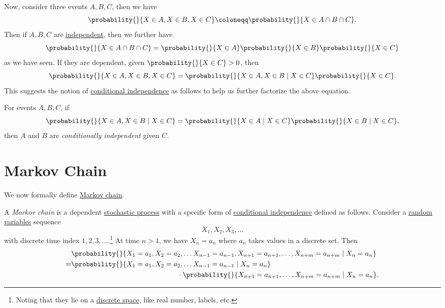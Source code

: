 Now, consider three events \(A, B, C\), then we have
\[
	\probability{}{X\in A, X\in B, X\in C} \coloneqq \probability{}{X\in A\cap B\cap C}.
\]
Then if \(A, B,  C\) are \hyperref[def:independent]{independent}, then we further have
\[
	\probability{}{X\in A\cap B\cap C}= \probability{}{X\in A}\probability{}{X\in B}\probability{}{X\in C}
\]
as we have seen. If they are dependent, given \(\probability{}{X\in C}>0\), then
\[
	\probability{}{X\in A, X\in B, X\in C} = \probability{}{X\in A, X\in B \mid X\in C}\probability{}{X\in C}.
\]
This suggests the notion of \hyperref[def:conditionally-independent]{conditional independence} as follows to help us further factorize the above equation.
\begin{definition}\label{def:conditionally-independent}
	For events \(A, B, C\), if
	\[
		\probability{}{X\in A, X\in B \mid X\in C} = \probability{}{X\in A \mid X\in C}\probability{}{X\in B \mid X\in C},
	\]
	then \(A\) and \(B\) are \emph{conditionally independent} given \(C\).
\end{definition}

\section{Markov Chain}
We now formally define \hyperref[def:Markov-chain]{Markov chain}.
\begin{definition}\label{def:Markov-chain}
	A \emph{Markov chain} is a dependent \hyperref[def:stochastic-process]{stochastic process} with a specific form of \hyperref[def:conditionally-independent]{conditional independence}
	defined as follows. Consider a \hyperref[def:random-variable]{random variables} sequence
	\[
		X_1, X_2, X_3, \ldots
	\]
	with discrete time index \(1, 2, 3, \ldots \).\footnote{Noting that they lie on a \underline{discrete space}, like real number, labels, etc.}
	At time \(n>1\), we have \(X_n = a_n\) where \(a_n\) takes values in a discrete set. Then
	\[
		\begin{split}
			&\probability{}{X_1 = a_1, X_2 = a_2,  \ldots X_{n-1} = a_{n-1}, X_{n+1} = a_{n+1},\ldots , X_{n+m} = a_{n+m}  \mid X_n = a_n }\\
			=&\probability{}{X_1 = a_1, X_2 = a_2,  \ldots X_{n-1} = a_{n-1}\mid X_n = a_n }\\
			&\qquad\qquad\qquad\qquad\qquad\qquad\qquad\quad\cdot \probability{}{X_{n+1} = a_{n+1},\ldots , X_{n+m} = a_{n+m}  \mid X_n = a_n}.
		\end{split}
	\]
\end{definition}

